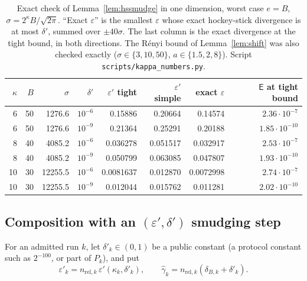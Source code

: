 \documentclass[11pt]{article}
\theoremstyle{definition}
\theoremstyle{plain}
\newcommand{\HSd}{\mathsf{E}}
\begin{document}
\begin{table}[ht]
\centering\small
\caption{Exact check of Lemma~\ref{lem:hssmudge} in one dimension, worst case $e=B$, $\sigma=2^\kappa B/\sqrt{2\pi}$. ``Exact $\varepsilon$'' is the smallest $\varepsilon$ whose exact hockey-stick divergence is at most $\delta'$, summed over $\pm40\sigma$. The last column is the exact divergence at the tight bound, in both directions. The R\'enyi bound of Lemma~\ref{lem:shift} was also checked exactly ($\sigma\in\{3,10,50\}$, $a\in\{1.5,2,8\}$). Script \texttt{scripts/kappa\_numbers.py}.}
\label{tab:hscheck}
\begin{tabular}{@{}rrrrrrrr@{}}
\toprule
$\kappa$ & $B$ & $\sigma$ & $\delta'$ & $\varepsilon'$ tight & $\varepsilon'$ simple & exact $\varepsilon$ & $\HSd$ at tight bound \\
\midrule
6 & 50 & 1276.6 & $10^{-6}$ & 0.15886 & 0.20664 & 0.14574 & $2.36\cdot10^{-7}$ \\
6 & 50 & 1276.6 & $10^{-9}$ & 0.21364 & 0.25291 & 0.20188 & $1.85\cdot10^{-10}$ \\
8 & 40 & 4085.2 & $10^{-6}$ & 0.036278 & 0.051517 & 0.032917 & $2.53\cdot10^{-7}$ \\
8 & 40 & 4085.2 & $10^{-9}$ & 0.050799 & 0.063085 & 0.047807 & $1.93\cdot10^{-10}$ \\
10 & 30 & 12255.5 & $10^{-6}$ & 0.0081637 & 0.012870 & 0.0072998 & $2.74\cdot10^{-7}$ \\
10 & 30 & 12255.5 & $10^{-9}$ & 0.012044 & 0.015762 & 0.011281 & $2.02\cdot10^{-10}$ \\
\bottomrule
\end{tabular}
\end{table}

\subsection{\texorpdfstring{Composition with an $(\varepsilon',\delta')$ smudging step}{Composition with an (eps', delta') smudging step}}

For an admitted run $k$, let $\delta'_k\in(0,1)$ be a public constant (a protocol constant such as $2^{-100}$, or part of $P_k$), and put
\[
  \varepsilon'_k=n_{\mathrm{rel},k}\,\varepsilon'(\kappa_k,\delta'_k),\qquad\hat\gamma_k=n_{\mathrm{rel},k}(\delta_{B,k}+\delta'_k).
\]
\end{document}
